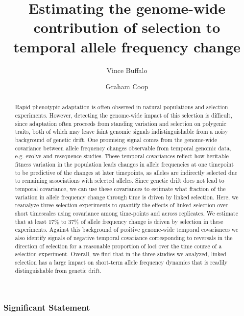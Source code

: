 \documentclass[11pt]{article}
\title{Estimating the genome-wide contribution of selection to temporal allele frequency change}
\author[$\ast$,$\dag$,$1$]{Vince Buffalo}
\author[$\dag$]{Graham Coop}
\affil[$\ast$]{\footnotesize Population Biology Graduate Group}
\affil[$\dag$]{\footnotesize Center for Population Biology, Department of Evolution and Ecology, University of California, Davis, CA 95616}
\affil[$1$]{\footnotesize Email for correspondence: \href{mailto:vsbuffalo@ucdavis.edu}{vsbuffalo@ucdavis.edu}}
\begin{document}
\maketitle

\linenumbers

\begin{abstract}

  Rapid phenotypic adaptation is often observed in natural populations and
  selection experiments. However, detecting the genome-wide impact of this
  selection is difficult, since adaptation often proceeds from standing
  variation and selection on polygenic traits, both of which may leave faint
  genomic signals indistinguishable from a noisy background of genetic drift.
  One promising signal comes from the genome-wide covariance between allele
  frequency changes observable from temporal genomic data, e.g.
  evolve-and-resequence studies. These temporal covariances reflect how
  heritable fitness variation in the population leads changes in allele
  frequencies at one timepoint to be predictive of the changes at later
  timepoints, as alleles are indirectly selected due to remaining associations
  with selected alleles. Since genetic drift does not lead to temporal
  covariance, we can use these covariances to estimate what fraction of the
  variation in allele frequency change through time is driven by linked
  selection. Here, we reanalyze three selection experiments to quantify the
  effects of linked selection over short timescales using covariance among
  time-points and across replicates. We estimate that at least 17\% to 37\% of
  allele frequency change is driven by selection in these experiments. Against
  this background of positive genome-wide temporal covariances we also identify
  signals of negative temporal covariance corresponding to reversals in the
  direction of selection for a reasonable proportion of loci over the time
  course of a selection experiment. Overall, we find that in the three studies
  we analyzed, linked selection has a large impact on short-term allele
  frequency dynamics that is readily distinguishable from genetic drift.

\end{abstract}

\subsubsection*{Significant Statement}
\end{document}
